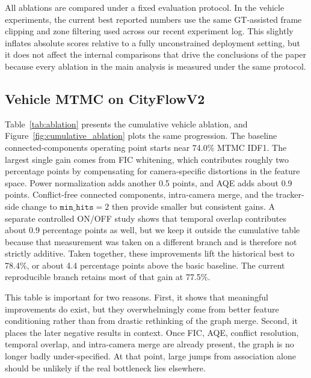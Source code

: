 \documentclass{ieeeaccess}
\begin{document}
All ablations are compared under a fixed evaluation protocol. In the vehicle experiments, the current best reported numbers use the same GT-assisted frame clipping and zone filtering used across our recent experiment log. This slightly inflates absolute scores relative to a fully unconstrained deployment setting, but it does not affect the internal comparisons that drive the conclusions of the paper because every ablation in the main analysis is measured under the same protocol.

\subsection{Vehicle MTMC on CityFlowV2}
Table~\ref{tab:ablation} presents the cumulative vehicle ablation, and Figure~\ref{fig:cumulative_ablation} plots the same progression. The baseline connected-components operating point starts near 74.0\% MTMC IDF1. The largest single gain comes from FIC whitening, which contributes roughly two percentage points by compensating for camera-specific distortions in the feature space. Power normalization adds another 0.5 points, and AQE adds about 0.9 points. Conflict-free connected components, intra-camera merge, and the tracker-side change to $\texttt{min\_hits}=2$ then provide smaller but consistent gains. A separate controlled ON/OFF study shows that temporal overlap contributes about 0.9 percentage points as well, but we keep it outside the cumulative table because that measurement was taken on a different branch and is therefore not strictly additive. Taken together, these improvements lift the historical best to 78.4\%, or about 4.4 percentage points above the basic baseline. The current reproducible branch retains most of that gain at 77.5\%.

\begin{table}[t]
\centering
\caption{Cumulative ablation study on CityFlowV2 vehicle MTMC. Each row adds one component or controlled improvement over the previous operating point.}
\label{tab:ablation}

\end{table}

This table is important for two reasons. First, it shows that meaningful improvements do exist, but they overwhelmingly come from better feature conditioning rather than from drastic rethinking of the graph merge. Second, it places the later negative results in context. Once FIC, AQE, conflict resolution, temporal overlap, and intra-camera merge are already present, the graph is no longer badly under-specified. At that point, large jumps from association alone should be unlikely if the real bottleneck lies elsewhere.
\end{document}
